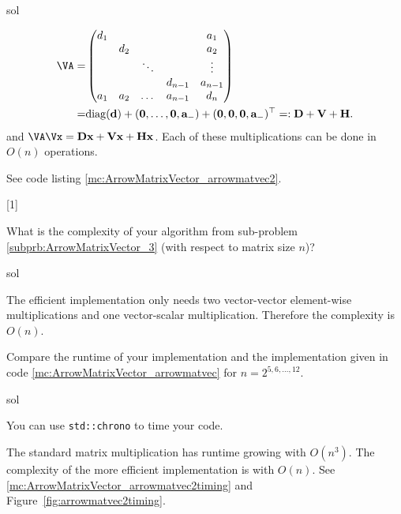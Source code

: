 \begin{samproblem}
\begin{subproblem}{}
\begin{samwriteprbpart}{sol}
\begin{samsolution}
    \begin{align}
    \VA= & \begin{pmatrix}
      d_1 &     &        &         & a_1     \\
          & d_2 &        &         & a_2     \\
          &     & \ddots &         & \vdots  \\
          &     &        & d_{n-1}  & a_{n-1} \\
      a_1 & a_2 & \dots  & a_{n-1}   & d_n     \\
    \end{pmatrix} \\
    = & \mathrm{diag}(\mathbf{d}) + (\mathbf{0},\dots,\mathbf{0}, \mathbf{a}_-) + (\mathbf{0},\mathbf{0},\mathbf{0},\mathbf{a}_-)^\top
    =: \mathbf{D} + \mathbf{V} + \mathbf{H}.
    \end{align}
    and $\VA \Vx = \mathbf{D} \mathbf{x} + \mathbf{V} \mathbf{x} + \mathbf{H} \mathbf{x}$. Each of these
    multiplications can be done in $O(n)$ operations.

    See code listing \ref{mc:ArrowMatrixVector_arrowmatvec2}.
\vspace{0.5cm}

[1]

\end{samsolution}
\end{samwriteprbpart}
\end{subproblem}

\begin{subproblem}{}
What is the complexity of your algorithm from sub-problem
\ref{subprb:ArrowMatrixVector_3} (with respect to matrix size $n$)?
 \begin{samwriteprbpart}{sol}
\begin{samsolution}
  The efficient implementation only needs two vector-vector element-wise multiplications and
  one vector-scalar multiplication. Therefore the complexity is $O(n)$.
\end{samsolution}
\end{samwriteprbpart}
\end{subproblem}


\begin{subproblem}{}
  Compare the runtime of your implementation and the implementation given in code
  \ref{mc:ArrowMatrixVector_arrowmatvec} for $n=2^{5,6,\ldots,12}$.
 \begin{samwriteprbpart}{sol}
 \begin{samhint}
  You can use \verb|std::chrono| to time your code.
 \end{samhint}
\begin{samsolution}
The standard matrix multiplication has runtime growing with $O(n^3)$.
The complexity of the more efficient implementation is with $O(n)$.
See \autoref{mc:ArrowMatrixVector_arrowmatvec2timing} and Figure~\ref{fig:arrowmatvec2timing}.


\end{samsolution}
\end{samwriteprbpart}
\end{subproblem}
\end{samproblem}
